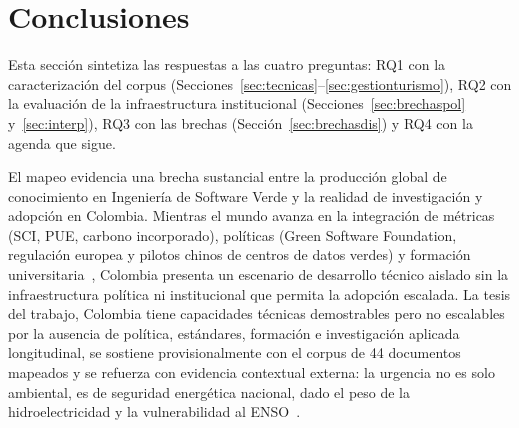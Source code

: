\documentclass[conference]{IEEEtran}
\begin{document}
\section{Conclusiones}\label{sec:concl}
Esta secci\'on sintetiza las respuestas a las cuatro preguntas: RQ1 con la caracterizaci\'on del corpus (Secciones~\ref{sec:tecnicas}--\ref{sec:gestionturismo}), RQ2 con la evaluaci\'on de la infraestructura institucional (Secciones~\ref{sec:brechaspol} y~\ref{sec:interp}), RQ3 con las brechas (Secci\'on~\ref{sec:brechasdis}) y RQ4 con la agenda que sigue.

El mapeo evidencia una brecha sustancial entre la producci\'on global de conocimiento en Ingenier\'ia de Software Verde y la realidad de investigaci\'on y adopci\'on en Colombia. Mientras el mundo avanza en la integraci\'on de m\'etricas (SCI, PUE, carbono incorporado), pol\'iticas (Green Software Foundation, regulaci\'on europea y pilotos chinos de centros de datos verdes) y formaci\'on universitaria~\cite{moreira2024,wangHowCanNational2026}, Colombia presenta un escenario de desarrollo t\'ecnico aislado sin la infraestructura pol\'itica ni institucional que permita la adopci\'on escalada. La tesis del trabajo, Colombia tiene capacidades t\'ecnicas demostrables pero no escalables por la ausencia de pol\'itica, est\'andares, formaci\'on e investigaci\'on aplicada longitudinal, se sostiene provisionalmente con el corpus de 44 documentos mapeados y se refuerza con evidencia contextual externa: la urgencia no es solo ambiental, es de seguridad energ\'etica nacional, dado el peso de la hidroelectricidad y la vulnerabilidad al ENSO~\cite{ng2017,crea2026,latif2009}.
\end{document}
